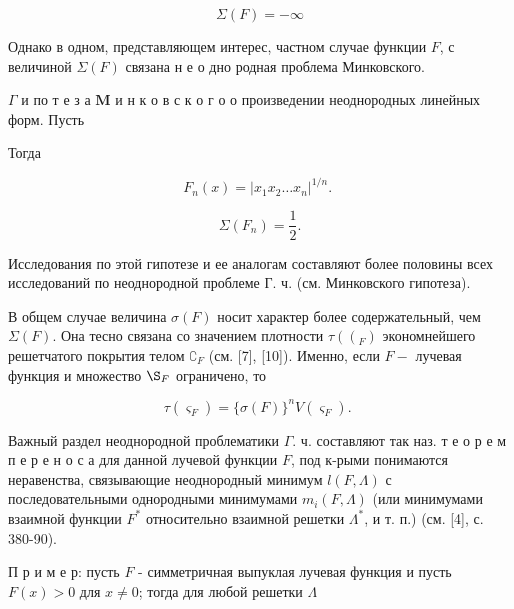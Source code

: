 \documentclass[10pt]{article}
\begin{document}
\[

\Sigma(F)=-\infty

\]



Однако в одном, представляющем интерес, частном случае функции $F$, с величиной $\Sigma(F)$ связана н е о дно родная проблема Минковского.



$\Gamma$ и по т е з а $\mathbf{M}$ и н к о в с к о г о о произведении неоднородных линейных форм. Пусть



Тогда



\[

F_{n}(x)=\left|x_{1} x_{2} \ldots x_{n}\right|^{1 / n} \text {. }

\]



\[

\Sigma\left(F_{n}\right)=\frac{1}{2} .

\]



Исследования по этой гипотезе и ее аналогам составляют более половины всех исследований по неоднородной проблеме Г. ч. (см. Минковского гипотеза).



В общем случае величина $\sigma(F)$ носит характер более содержательный, чем $\Sigma(F)$. Она тесно связана со значением плотности $\tau\left(\left(_{F}\right)\right.$ экономнейшего решетчатого покрытия телом $\complement_{F}$ (см. [7], [10]). Именно, если $F-$ лучевая функция и множество $\S_{F}$ ограничено, то



\[

\tau\left(\varsigma_{F}\right)=\{\sigma(F)\}^{n} V\left(\varsigma_{F}\right) \text {. }

\]



Важный раздел неоднородной проблематики $\Gamma$. ч. составляют так наз. т е о р е м п е р е н о с а для данной лучевой функции $F$, под к-рыми понимаются неравенства, связывающие неоднородный минимум $l(F, \Lambda)$ с последовательными однородными минимумами $m_{i}(F, \Lambda)$ (или минимумами взаимной функции $F^{*}$ относительно взаимной решетки $\Lambda^{*}$, и т. п.) (см. [4], с. 380-90).



П р и м е р: пусть $F$ - симметричная выпуклая лучевая функция и пусть $F(x)>0$ для $x \neq 0$; тогда для любой решетки $\Lambda$
\end{document}
